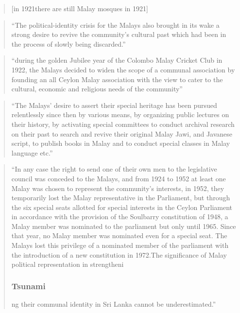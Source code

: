 \begin{quote}
    [in 1921there are still Malay mosques in 1921]
\end{quote}

\begin{quote}
    ``The political-identity crisis for the Malays also brought in its wake a strong desire to revive the community's cultural past which had been in the process of slowly being discarded.''\citet[16f]{Hussainmiya1987}
\end{quote}

\begin{quote}
    ``during the golden Jubilee year of the Colombo Malay Cricket Club in 1922, the Malays decided to widen the scope of a communal association by founding an all Ceylon Malay association with the view to cater to the cultural, economic and religious needs of the community''\citet[16f]{Hussainmiya1987}
\end{quote}

\begin{quote}
    ``The Malays' desire to assert their special heritage has been pursued relentlessly since then by various means, by organizing public lectures on their history, by activating special committees to conduct archival research on their past to search and revive their original Malay Jawi, and Javanese script, to publish books in Malay and to conduct special classes in Malay language etc.''\citet[18]{Hussainmiya1987}
\end{quote}

\begin{quote}
    ``In any case the right to send one of their own men to the legislative council was conceded to the Malays, and from 1924 to 1952 at least one Malay was chosen to represent the community's interests, in 1952, they temporarily lost the Malay representative in the Parliament, but through the six special seats allotted for special interests in the Ceylon Parliament in accordance with the provision of the Soulbarry constitution of 1948, a Malay member was nominated to the parliament but only until 1965. Since that year, no Malay member was nominated even for a special seat. The Malays lost this privilege of a nominated member of the parliament with the introduction of a new constitution in 1972.\el The significance of Malay political representation in strengtheni
\subsubsection{Tsunami}\label{sec:slmbg:Tsunami}
ng their communal identity in Sri Lanka cannot be underestimated.''\citet[20]{Hussainmiya1987}
\end{quote}

